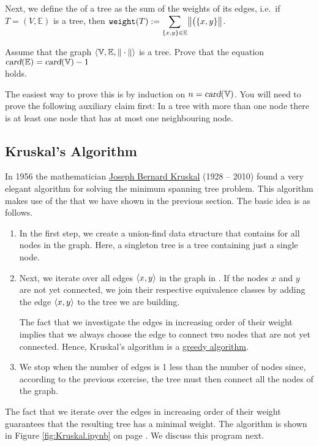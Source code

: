 Next, we define the  of a tree as the sum of the weights of its edges,
i.e.~if $T = (V,\mathbb{E})$ is a tree, then
$\displaystyle \mathtt{weight}(T) := \sum\limits_{\{x,y\} \in \mathbb{E}} \bigl\|\bigl(\{x,y\}\bigr\|$.

\exercise
Assume that the graph $\langle {\mathbb V}, {\mathbb E}, \|\cdot\|\rangle$ is a tree.  Prove that the equation
\\[0.2cm]
\hspace*{1.3cm}
$\textsl{card}({\mathbb E}) = \textsl{card}({\mathbb V}) - 1$
\\[0.2cm]
holds.  
\vspace*{0.2cm}

\hint
The easiest way to prove this is by induction on $n = \textsl{card}(\mathbb{V})$.  You will need to prove the
following auxiliary claim first: In a tree with more than one node there is at least one node that has
at most one neighbouring node. 
\eox

\subsection{Kruskal's Algorithm}
In 1956 the mathematician \href{https://en.wikipedia.org/wiki/Joseph_Kruskal}{Joseph Bernard Kruskal} (1928 -- 2010) 
found a very elegant algorithm for solving the minimum spanning tree problem.   This algorithm makes use
of the  that we have shown in the previous section.  The basic idea is as
follows.
\begin{enumerate}
\item In the first step, we create a union-find data structure that contains 
      for all nodes in the graph.  Here, a singleton tree is a tree containing just a single node.
\item Next, we iterate over all edges $\pair(x, y)$ in the graph in .
      If the nodes $x$ and $y$ are not yet connected, we join their respective equivalence classes by adding
      the edge $\pair(x, y)$ to the tree we are building.

      The fact that we investigate the edges in increasing order of their weight implies that we always choose
      the  edge to connect two nodes that are not yet connected.  Hence, Kruskal's algorithm is a
      \href{https://en.wikipedia.org/wiki/Greedy_algorithm}{greedy algorithm}.
\item We stop when the number of edges is 1 less than the number of nodes since, according to the
      previous exercise, the tree must then connect all the nodes of the graph. 
\end{enumerate}
The fact that we iterate over the edges in increasing order of their weight guarantees that the
resulting tree has a minimal weight.
The algorithm is shown in Figure \ref{fig:Kruskal.ipynb} on page \pageref{fig:Kruskal.ipynb}.  We
discuss this program next.

